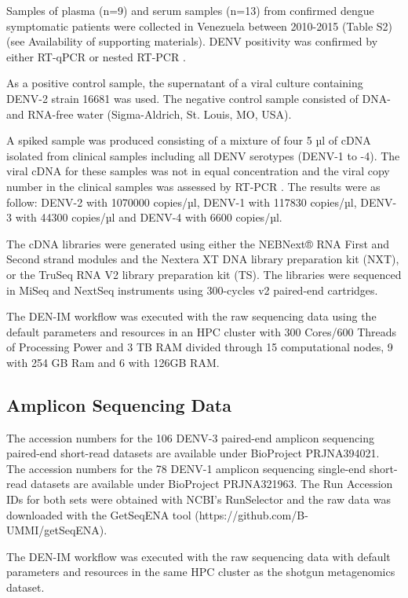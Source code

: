 Samples of plasma (n=9) and serum samples (n=13) from confirmed dengue symptomatic patients were collected in Venezuela between 2010-2015 (Table S2) (see Availability of supporting materials). DENV positivity was confirmed by either RT-qPCR \citep{santiago_analytical_2013} or nested RT-PCR \citep{lanciotti_rapid_1992}. 

As a positive control sample, the supernatant of a viral culture containing DENV-2 strain 16681 was used. The negative control sample consisted of DNA- and RNA-free water (Sigma-Aldrich, St. Louis, MO, USA). 

A spiked sample was produced consisting of a mixture of four 5 µl of cDNA isolated from clinical samples including all DENV serotypes (DENV-1 to -4). The viral cDNA for these samples was not in equal concentration and the viral copy number in the clinical samples was assessed by RT-PCR \citep{lanciotti_rapid_1992}. The results were as follow: DENV-2 with 1070000 copies/µl, DENV-1 with 117830 copies/µl, DENV-3 with 44300 copies/µl and DENV-4 with 6600 copies/µl.

The cDNA libraries were generated using either the NEBNext® RNA First and Second strand modules and the Nextera XT DNA library preparation kit (NXT), or the TruSeq RNA V2 library preparation kit (TS). The libraries were sequenced in MiSeq and NextSeq instruments using 300-cycles v2 paired-end cartridges.

The DEN-IM workflow was executed with the raw sequencing data using the default parameters and resources in an HPC cluster with 300 Cores/600 Threads of Processing Power and 3 TB RAM divided through 15 computational nodes, 9 with 254 GB Ram and 6 with 126GB RAM.

\subsection{Amplicon Sequencing Data} \label{chap4_sup_amplicon}

The accession numbers for the 106 DENV-3 paired-end amplicon sequencing paired-end short-read datasets are available under BioProject PRJNA394021. The accession numbers for the 78 DENV-1 amplicon sequencing single-end short-read datasets are available under BioProject PRJNA321963. The Run Accession IDs for both sets were obtained with NCBI’s RunSelector and the raw data was downloaded with the GetSeqENA tool (https://github.com/B-UMMI/getSeqENA).

The DEN-IM workflow was executed with the raw sequencing data with default parameters and resources in the same HPC cluster as the shotgun metagenomics dataset.

